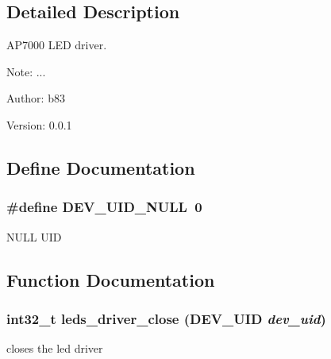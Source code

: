 \subsection{Detailed Description}
AP7000 LED driver. 

\begin{Desc}
\item[Note:]... \end{Desc}
\begin{Desc}
\item[Author:]b83 \end{Desc}
\begin{Desc}
\item[Version:]0.0.1 \end{Desc}


\subsection{Define Documentation}
\hypertarget{group___l_e_d___d_r_i_v_e_r_gda38030928bc5c3bdec6b7613fd3cab9}{
\subsubsection[{DEV\_\-UID\_\-NULL}]{\setlength{\rightskip}{0pt plus 5cm}\#define DEV\_\-UID\_\-NULL~0}}
\label{group___l_e_d___d_r_i_v_e_r_gda38030928bc5c3bdec6b7613fd3cab9}


NULL UID 

\subsection{Function Documentation}
\hypertarget{group___l_e_d___d_r_i_v_e_r_g1c9941f649946c996f3b22a47d809f94}{
\subsubsection[{leds\_\-driver\_\-close}]{\setlength{\rightskip}{0pt plus 5cm}int32\_\-t leds\_\-driver\_\-close ({\bf DEV\_\-UID} {\em dev\_\-uid})}}
\label{group___l_e_d___d_r_i_v_e_r_g1c9941f649946c996f3b22a47d809f94}


closes the led driver 


